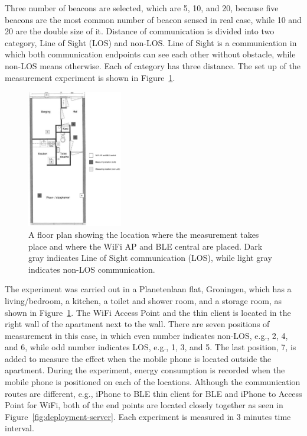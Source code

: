 \documentclass[journal]{vgtc}                %
\begin{document}
Three number of beacons are selected, which are 5, 10, and 20, because five beacons are the most common number of beacon sensed in real case, while 10 and 20 are the double size of it. Distance of communication is divided into two category, Line of Sight (LOS) and non-LOS. Line of Sight is a communication in which both communication endpoints can see each other without obstacle, while non-LOS means otherwise. Each of category has three distance. The set up of the measurement experiment is shown in Figure~\ref{fig:experiment-map}.

\begin{figure}
  \centering
    \includegraphics[width=0.37\textwidth]{experiment-map}
  \caption{A floor plan showing the location where the measurement takes place  and where the WiFi AP and BLE central are placed. Dark gray indicates Line of Sight communication (LOS), while light gray indicates non-LOS communication.}
  \label{fig:experiment-map}
\end{figure}

The experiment was carried out in a Planetenlaan flat, Groningen, which has a living/bedroom, a kitchen, a toilet and shower room, and a storage room, as shown in Figure~\ref{fig:experiment-map}. The WiFi Access Point and the thin client is located in the right wall of the apartment next to the wall. There are seven positions of measurement in this case, in which even number indicates non-LOS, e.g., 2, 4, and 6, while odd number indicates LOS, e.g., 1, 3, and 5. The last position, 7, is added to measure the effect when the mobile phone is located outside the apartment. During the experiment, energy consumption is recorded when the mobile phone is positioned on each of the locations. Although the communication routes are different, e.g., iPhone to BLE thin client for BLE and iPhone to Access Point for WiFi, both of the end points are located closely together as seen in Figure~\ref{fig:deployment-server}. Each experiment is measured in 3 minutes time interval.
\end{document}
